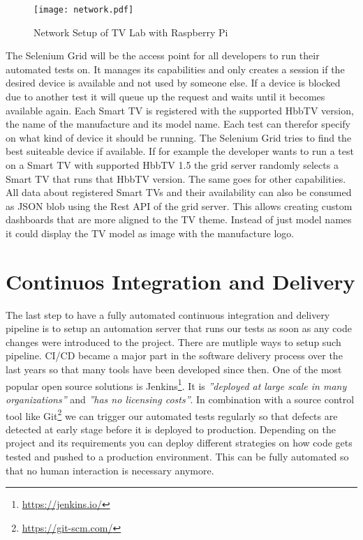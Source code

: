 \vspace{1cm}
\begin{figure}[htb]
  \centering
  \texttt{[image: network.pdf]}\\
  \caption{Network Setup of TV Lab with Raspberry Pi}\label{fig:network}
\end{figure}
\vspace{0.5cm}

The Selenium Grid will be the access point for all developers to run their automated tests on. It manages its capabilities and only creates a session if the desired device is available and not used by someone else. If a device is blocked due to another test it will queue up the request and waits until it becomes available again. Each Smart TV is registered with the supported HbbTV version, the name of the manufacture and its model name. Each test can therefor specify on what kind of device it should be running. The Selenium Grid tries to find the best suiteable device if available. If for example the developer wants to run a test on a Smart TV with supported HbbTV 1.5 the grid server randomly selects a Smart TV that runs that HbbTV version. The same goes for other capabilities. All data about registered Smart TVs and their availability can also be consumed as JSON blob using the Rest API of the grid server. This allows creating custom dashboards that are more aligned to the TV theme. Instead of just model names it could display the TV model as image with the manufacture logo.

\section{Continuos Integration and Delivery\label{sec:cicd}}

The last step to have a fully automated continuous integration and delivery pipeline is to setup an automation server that runs our tests as soon as any code changes were introduced to the project. There are mutliple ways to setup such pipeline. CI/CD became a major part in the software delivery process over the last years so that many tools have been developed since then. One of the most popular open source solutions is Jenkins\footnote{\url{https://jenkins.io/}}. It is \textit{''deployed at large scale in many organizations''}\cite{jenkins} and \textit{''has no licensing costs''}\cite{jenkins}. In combination with a source control tool like Git\footnote{\url{https://git-scm.com/}} we can trigger our automated tests regularly so that defects are detected at early stage before it is deployed to production. Depending on the project and its requirements you can deploy different strategies on how code gets tested and pushed to a production environment. This can be fully automated so that no human interaction is necessary anymore.

